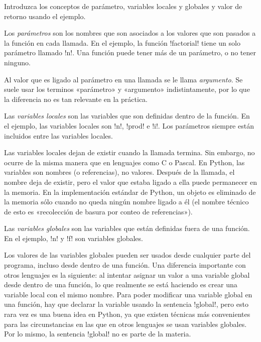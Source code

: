\documentclass[10pt]{article}
\begin{document}

  Introduzca los conceptos de
  parámetro, variables locales y globales y valor de retorno
  usando el ejemplo.

  Los \emph{parámetros} son los nombres que son asociados
  a los valores que son pasados a la función en cada llamada.
  En el ejemplo,
  la función \li!factorial! tiene un solo parámetro llamado \li!n!.
  Una función puede tener más de un parámetro,
  o no tener ninguno.

  Al valor que es ligado al parámetro en una llamada se le llama \emph{argumento}.
  Se suele usar los terminos «parámetro» y «argumento» indistintamente,
  por lo que la diferencia no es tan relevante en la práctica.

  Las \emph{variables locales}
  son las variables que son definidas
  dentro de la función.
  En el ejemplo,
  las variables locales son \li!n!, \li!prod! e \li!i!.
  Los parámetros siempre están incluidos entre las variables locales.

  Las variables locales dejan de existir cuando la llamada termina.
  Sin embargo, no ocurre de la misma manera que en lenguajes como C o Pascal.
  En Python, las variables son nombres (o referencias), no valores.
  Después de la llamada, el nombre deja de existir,
  pero el valor que estaba ligado a ella puede permanecer en la memoria.
  En la implementación estándar de Python,
  un objeto es eliminado de la memoria
  sólo cuando no queda ningún nombre ligado a él
  (el nombre técnico de esto es «recolección de basura por conteo de referencias»).

  Las \emph{variables globales}
  son las variables que están definidas fuera de una función.
  En el ejemplo,
  \li!n! y \li!f! son variables globales.

  Los valores de las variables globales pueden ser usados
  desde cualquier parte del programa, incluso desde dentro de una función.
  Una diferencia importante con otros lenguajes es la siguiente:
  al intentar asignar un valor a una variable global
  desde dentro de una función, lo que realmente se está haciendo
  es crear una variable local con el mismo nombre.
  Para poder modificar una variable global en una función,
  hay que declarar la variable usando la sentencia \li!global!,
  pero esto rara vez es una buena idea en Python,
  ya que existen técnicas más convenientes
  para las circunstancias en las que en otros lenguajes
  se usan variables globales.
  Por lo mismo, la sentencia \li!global! no es parte de la materia.
\end{document}
